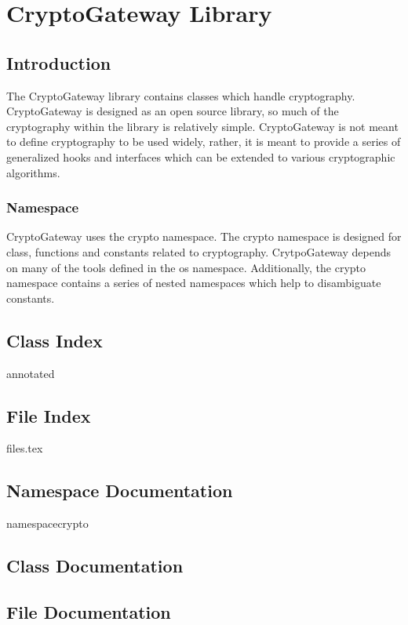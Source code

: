 \part{CryptoGateway Library} \label{sec:cryptogateway}

	\chapter{Introduction}

	The CryptoGateway library contains classes which handle cryptography.  CryptoGateway is designed as an open source library, so much of the cryptography within the library is relatively simple.  CryptoGateway is not meant to define cryptography to be used widely, rather, it is meant to provide a series of generalized hooks and interfaces which can be extended to various cryptographic algorithms.
		
		\section{Namespace} \label{sec:Namespace}
		CryptoGateway uses the crypto namespace.  The crypto namespace is designed for class, functions and constants related to cryptography.  CrytpoGateway depends on many of the tools defined in the os namespace.  Additionally, the crypto namespace contains a series of nested namespaces which help to disambiguate constants.

	\renewcommand{\DOXYGENFOLDER}{../../CryptoGateway/Documentation/doxygenFiles/latex/}
	
	\chapter{Class Index}
		{annotated}
	\chapter{File Index}
		{files.tex}
	\chapter{Namespace Documentation}
		{namespacecrypto}
	
	\chapter{Class Documentation}
	
		
		
	\chapter{File Documentation}
	
		